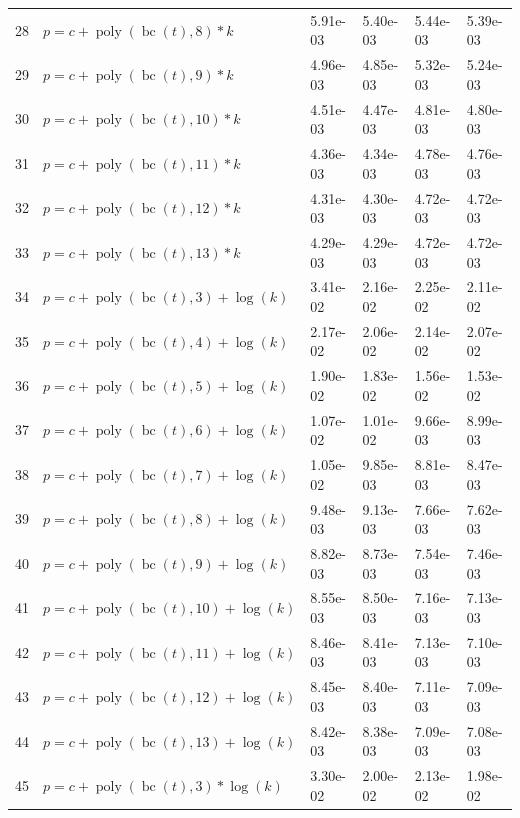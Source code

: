 \documentclass[12pt,a4paper]{article}
\DeclareMathOperator{\bc}{bc}
\DeclareMathOperator{\poly}{poly}
\begin{document}
\begin{longtable}[t]{ll>{\raggedleft\arraybackslash}p{2cm}>{\raggedleft\arraybackslash}p{2cm}>{\raggedleft\arraybackslash}p{2cm}>{\raggedleft\arraybackslash}p{2cm}}
28 & $p = c + \poly\left( \bc(t), 8 \right) * k$ & 5.91e-03 & 5.40e-03 & 5.44e-03 & 5.39e-03\\
\rowcolor{gray!6}  29 & $p = c + \poly\left( \bc(t), 9 \right) * k$ & 4.96e-03 & 4.85e-03 & 5.32e-03 & 5.24e-03\\
30 & $p = c + \poly\left( \bc(t), 10 \right) * k$ & 4.51e-03 & 4.47e-03 & 4.81e-03 & 4.80e-03\\
\rowcolor{gray!6}  31 & $p = c + \poly\left( \bc(t), 11 \right) * k$ & 4.36e-03 & 4.34e-03 & 4.78e-03 & 4.76e-03\\
32 & $p = c + \poly\left( \bc(t), 12 \right) * k$ & 4.31e-03 & 4.30e-03 & 4.72e-03 & 4.72e-03\\
\rowcolor{gray!6}  33 & $p = c + \poly\left( \bc(t), 13 \right) * k$ & 4.29e-03 & 4.29e-03 & 4.72e-03 & 4.72e-03\\
34 & $p = c + \poly\left( \bc(t), 3 \right) + \log(k)$ & 3.41e-02 & 2.16e-02 & 2.25e-02 & 2.11e-02\\
\rowcolor{gray!6}  35 & $p = c + \poly\left( \bc(t), 4 \right) + \log(k)$ & 2.17e-02 & 2.06e-02 & 2.14e-02 & 2.07e-02\\
36 & $p = c + \poly\left( \bc(t), 5 \right) + \log(k)$ & 1.90e-02 & 1.83e-02 & 1.56e-02 & 1.53e-02\\
\rowcolor{gray!6}  37 & $p = c + \poly\left( \bc(t), 6 \right) + \log(k)$ & 1.07e-02 & 1.01e-02 & 9.66e-03 & 8.99e-03\\
38 & $p = c + \poly\left( \bc(t), 7 \right) + \log(k)$ & 1.05e-02 & 9.85e-03 & 8.81e-03 & 8.47e-03\\
\rowcolor{gray!6}  39 & $p = c + \poly\left( \bc(t), 8 \right) + \log(k)$ & 9.48e-03 & 9.13e-03 & 7.66e-03 & 7.62e-03\\
40 & $p = c + \poly\left( \bc(t), 9 \right) + \log(k)$ & 8.82e-03 & 8.73e-03 & 7.54e-03 & 7.46e-03\\
\rowcolor{gray!6}  41 & $p = c + \poly\left( \bc(t), 10 \right) + \log(k)$ & 8.55e-03 & 8.50e-03 & 7.16e-03 & 7.13e-03\\
42 & $p = c + \poly\left( \bc(t), 11 \right) + \log(k)$ & 8.46e-03 & 8.41e-03 & 7.13e-03 & 7.10e-03\\
\rowcolor{gray!6}  43 & $p = c + \poly\left( \bc(t), 12 \right) + \log(k)$ & 8.45e-03 & 8.40e-03 & 7.11e-03 & 7.09e-03\\
44 & $p = c + \poly\left( \bc(t), 13 \right) + \log(k)$ & 8.42e-03 & 8.38e-03 & 7.09e-03 & 7.08e-03\\
\rowcolor{gray!6}  45 & $p = c + \poly\left( \bc(t), 3 \right) * \log(k)$ & 3.30e-02 & 2.00e-02 & 2.13e-02 & 1.98e-02\\

\end{longtable}
\end{document}
